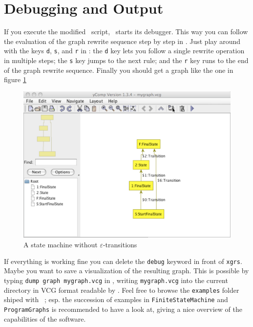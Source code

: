 \section{Debugging and Output}
If you execute the modified \GrShell\ script, \GrG\ starts its debugger.
This way you can follow the evaluation of the graph rewrite sequence step by step in \yComp.
Just play around with the keys \texttt{d}, \texttt{s}, and \texttt{r} in \GrShell: the \texttt{d} key lets you follow a single rewrite operation in multiple steps; the \texttt{s} key jumps to the next rule; and the \texttt{r} key runs to the end of the graph rewrite sequence.
Finally you should get a graph like the one in figure \ref{fig:quick:final}
\begin{figure}[htbp]
	\centering
	\includegraphics[width=0.8\linewidth]{fig/quickfinal}
	\caption{A state machine without $\varepsilon$-transitions}
	\label{fig:quick:final}
\end{figure}

If everything is working fine you can delete the \texttt{debug} keyword in front of \texttt{xgrs}.
Maybe you want to save a visualization of the resulting graph.
This is possible by typing \texttt{dump graph mygraph.vcg} in \GrShell,
writing \texttt{mygraph.vcg} into the current directory in VCG format readable by \yComp.
Feel free to browse the \texttt{examples} folder shiped with \GrG\ ;
esp. the succession of examples in \texttt{FiniteStateMachine} and \texttt{ProgramGraphs}
is recommended to have a look at, giving a nice overview of the capabilities of the software.

